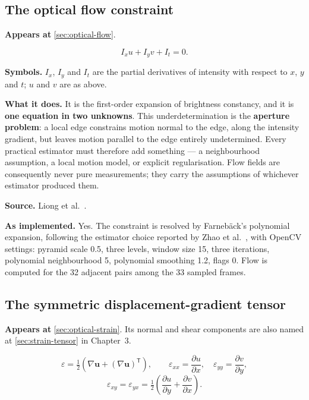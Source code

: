 \subsection{The optical flow constraint}
\label{eq:flow-constraint}

\textbf{Appears at} \autoref{sec:optical-flow}.

\[
    I_xu+I_yv+I_t=0.
\]

\textbf{Symbols.} $I_x$, $I_y$ and $I_t$ are the partial derivatives of
intensity with respect to $x$, $y$ and $t$; $u$ and $v$ are as above.

\textbf{What it does.} It is the first-order expansion of brightness
constancy, and it is \textbf{one equation in two unknowns}. This
underdetermination is the \textbf{aperture problem}: a local edge constrains
motion normal to the edge, along the intensity gradient, but leaves motion
parallel to the edge entirely undetermined. Every practical estimator must
therefore add something --- a neighbourhood assumption, a local motion model,
or explicit regularisation. Flow fields are consequently never pure
measurements; they carry the assumptions of whichever estimator produced them.

\textbf{Source.} Liong et al.~\cite{liong2019a}.

\textbf{As implemented.} Yes. The constraint is resolved by Farneb\"ack's
polynomial expansion, following the estimator choice reported by Zhao et
al.~\cite{zhaoS2021}, with OpenCV settings: pyramid scale 0.5, three levels,
window size 15, three iterations, polynomial neighbourhood 5, polynomial
smoothing 1.2, flags 0. Flow is computed for the 32 adjacent pairs among the
33 sampled frames.

\subsection{The symmetric displacement-gradient tensor}
\label{eq:strain-tensor}

\textbf{Appears at} \autoref{sec:optical-strain}. Its normal and shear
components are also named at \autoref{sec:strain-tensor} in Chapter~3.

\[
    \varepsilon=\tfrac12\left(\nabla\mathbf{u}
                         +(\nabla\mathbf{u})^{\mathsf T}\right),
    \qquad
    \varepsilon_{xx}=\frac{\partial u}{\partial x},\quad
    \varepsilon_{yy}=\frac{\partial v}{\partial y},
\]
\[
    \varepsilon_{xy}=\varepsilon_{yx}
       =\tfrac12\left(\frac{\partial u}{\partial y}
                    +\frac{\partial v}{\partial x}\right).
\]


